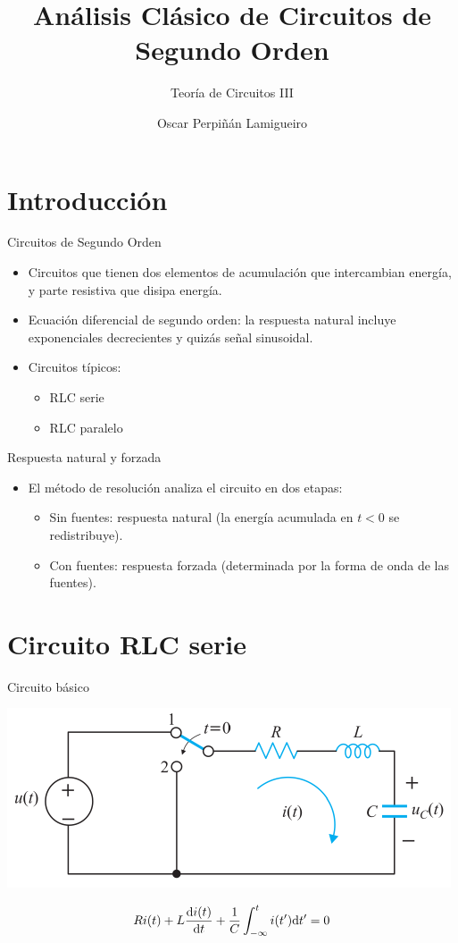 \documentclass[aspectratio=169, usenames,svgnames,dvipsnames]{beamer}
\author{Oscar Perpiñán Lamigueiro}
\date{}
\title{Análisis Clásico de Circuitos de Segundo Orden}
\subtitle{Teoría de Circuitos III}
\begin{document}
\maketitle

\section{Introducción}
\label{sec:org6a1924a}

\begin{frame}[label={sec:orgfb16cc7}]{Circuitos de Segundo Orden}
\begin{itemize}
\item Circuitos que tienen \alert{dos elementos de acumulación} que intercambian energía, y parte resistiva que disipa energía.
\item \alert{Ecuación diferencial de segundo orden}: la respuesta natural incluye exponenciales decrecientes y quizás señal sinusoidal.
\item Circuitos típicos:
\begin{itemize}
\item RLC serie
\item RLC paralelo
\end{itemize}
\end{itemize}
\end{frame}
\begin{frame}[label={sec:org38d1728}]{Respuesta natural y forzada}
\begin{itemize}
\item El método de resolución analiza el circuito en dos etapas:
\begin{itemize}
\item Sin fuentes: \alert{respuesta natural} (la energía acumulada en \(t < 0\) se redistribuye).
\item Con fuentes: \alert{respuesta forzada} (determinada por la forma de onda de las fuentes).
\end{itemize}
\end{itemize}
\end{frame}

\section{Circuito RLC serie}
\label{sec:orgcba1ba3}
\begin{frame}[label={sec:org9c91ddb}]{Circuito básico}
\begin{center}
\includegraphics[height=0.5\textheight]{../figs/RLC_serie.pdf}
\end{center}

\[
  Ri(t) + L\diff{i(t)}{t} + \frac{1}{C}\int_{-\infty}^t i(t') \mathrm{d}t' = 0
\]
\end{frame}
\end{document}
